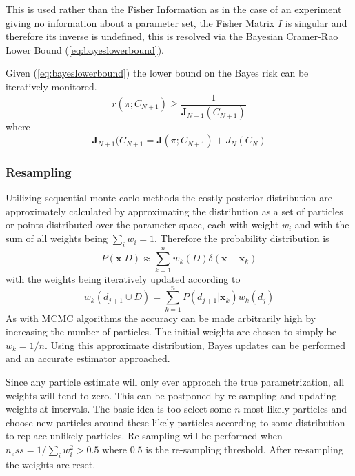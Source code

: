 This is used rather than the Fisher Information as in the case of an experiment giving no information about a parameter set, the Fisher Matrix $I$ is singular and therefore its inverse is undefined, this is resolved via the Bayesian Cramer-Rao Lower Bound (\ref{eq:bayeslowerbound}). 

Given (\ref{eq:bayeslowerbound}) the lower bound on the Bayes risk can be iteratively monitored. 
\begin{equation}
r(\pi;C_{N+1})\geq \frac{1}{\mathbf{J}_{N+1}(C_{N+1})}
\end{equation}
where 
\begin{equation}
\mathbf{J}_{N+1}(C_{N+1} = \mathbf{J}(\pi;C_{N+1})+ J_N(C_N)
\label{eq:riskiteration}
\end{equation}
\subsubsection{Resampling}
\label{sec:resampling}
Utilizing sequential monte carlo methods the costly posterior distribution are approximately calculated by approximating the distribution as a set of particles or points distributed over the parameter space, each with weight $w_i$ and with the sum of all weights being $\sum \limits_i w_i = 1$. Therefore the probability distribution is 
\begin{equation*}
P(\mathbf{x}|D) \approx \sum \limits_{k=1}^n w_k(D)\delta(\mathbf{x}-\mathbf{x}_k)
\end{equation*}
with the weights being iteratively updated according to 
\begin{equation*}
w_k(d_{j+1} \cup D) = \sum \limits_{k=1}^n P(d_{j+1}|\mathbf{x}_k)w_k(d_j)
\end{equation*}
As with MCMC algorithms the accuracy can be made arbitrarily high by increasing the number of particles. The initial weights are chosen to simply be $w_k = 1/n$. Using this approximate distribution, Bayes updates can be performed and an accurate estimator approached.

Since any particle estimate will only ever approach the true parametrization, all weights will tend to zero. This can be postponed by re-sampling and updating weights at intervals. The basic idea is too select some $n$ most likely particles and choose new particles around these likely particles according to some distribution to replace unlikely particles. Re-sampling will be performed when $n_ess = 1/\sum \limits_i w_i^2>0.5$ where $0.5$ is the re-sampling threshold. After re-sampling the weights are reset. 

